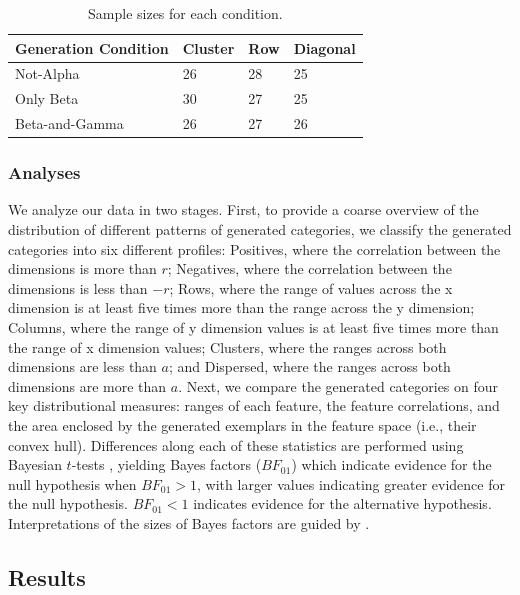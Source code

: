 \documentclass[10pt,letterpaper]{article}
\begin{document}
\begin{table}[H]
\begin{center} 
\caption{Sample sizes for each condition.} 
\label{table:samplesize} 
\vskip 0.12in
\begin{tabular}{llll} 
\hline
Generation Condition    &  Cluster & Row & Diagonal \\
\hline
Not-Alpha      &   26 & 28 & 25 \\
Only Beta      &   30 & 27 & 25 \\
Beta-and-Gamma &   26 & 27 & 26 \\
\hline
\end{tabular} 
\end{center} 
\end{table}

\subsubsection{Analyses}

We analyze our data in two stages. First, to provide a coarse overview of the distribution of different patterns of generated categories, we classify the generated categories into
six different profiles: Positives, where the correlation between the dimensions
is more than $r$; Negatives, where the correlation between the dimensions is less
than $-r$; Rows, where the range of values across the x dimension is at least
five times more than the range across the y dimension; Columns, where the range
of y dimension values is at least five times more than the range of x dimension
values; Clusters, where the ranges across both dimensions are less than $a$; and
Dispersed, where the ranges across both dimensions are more than $a$. Next, we compare the generated categories on four key distributional measures: ranges of each feature, the feature correlations, and the area enclosed by the generated exemplars in the feature space (i.e., their convex hull). Differences along each of these statistics are performed using Bayesian $t$-tests \cite{rouder2009bayesian}, yielding Bayes factors ($BF_{01}$) which indicate evidence for the null hypothesis when $BF_{01} > 1$, with larger values indicating greater evidence for the null hypothesis. $BF_{01} < 1$ indicates evidence for the alternative hypothesis. Interpretations of the sizes of Bayes factors are guided by .

\subsection{Results}
\end{document}

